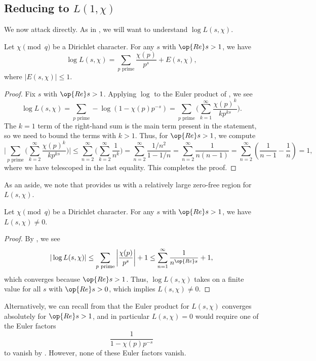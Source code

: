 \documentclass[../notes.tex]{subfiles}
\begin{document}
\subsection{Reducing to \texorpdfstring{$L(1,\chi)$}{ L(1,chi)}}
We now attack  directly. As in , we will want to understand $\log L(s,\chi)$.
\begin{lemma} \label{lem:log-l-s-chi}
	Let $\chi\pmod q$ be a Dirichlet character. For any $s$ with $\op{Re}s>1$, we have
	\[\log L(s,\chi)=\sum_{p\text{ prime}}\frac{\chi(p)}{p^s}+E(s,\chi),\]
	where $|E(s,\chi)|\le1$.
\end{lemma}
\begin{proof}
	Fix $s$ with $\op{Re}s>1$. Applying $\log$ to the Euler product of , we see
	\[\log L(s,\chi)=\sum_{p\text{ prime}}-\log\left(1-\chi(p)p^{-s}\right)=\sum_{p\text{ prime}}\Bigg(\sum_{k=1}^\infty\frac{\chi(p)^k}{kp^{ks}}\Bigg).\]
	The $k=1$ term of the right-hand sum is the main term present in the statement, so we need to bound the terms with $k>1$. Thus, for $\op{Re}s>1$, we compute
	\[\Bigg|\sum_{p\text{ prime}}\Bigg(\sum_{k=2}^\infty\frac{\chi(p)^k}{kp^{ks}}\Bigg)\Bigg|\le\sum_{n=2}^\infty\Bigg(\sum_{k=2}^\infty\frac1{n^k}\Bigg)=\sum_{n=2}^\infty\frac{1/n^2}{1-1/n}=\sum_{n=2}^\infty\frac1{n(n-1)}=\sum_{n=2}^\infty\left(\frac1{n-1}-\frac1n\right)=1,\]
	where we have telescoped in the last equality. This completes the proof.
\end{proof}
As an aside, we note that  provides us with a relatively large zero-free region for $L(s,\chi)$.
\begin{corollary} \label{cor:dumb-zero-free}
	Let $\chi\pmod q$ be a Dirichlet character. For any $s$ with $\op{Re}s>1$, we have $L(s,\chi)\ne0$.
\end{corollary}
\begin{proof}
	By , we see
	\[|\log L(s,\chi)|\le\sum_{p\text{ prime}}\left|\frac{\chi(p)}{p^s}\right|+1\le\sum_{n=1}^\infty\frac1{n^{\op{Re}s}}+1,\]
	which converges because $\op{Re}s>1$. Thus, $\log L(s,\chi)$ takes on a finite value for all $s$ with $\op{Re}s>0$, which implies $L(s,\chi)\ne0$.
\end{proof}
\begin{remark}
	Alternatively, we can recall from  that the Euler product for $L(s,\chi)$ converges absolutely for $\op{Re}s>1$, and in particular $L(s,\chi)=0$ would require one of the Euler factors
	\[\frac1{1-\chi(p)p^{-s}}\]
	to vanish by . However, none of these Euler factors vanish.
\end{remark}
\end{document}
